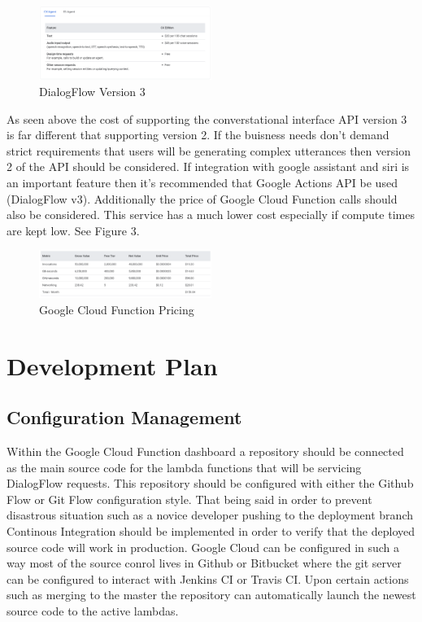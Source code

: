 \documentclass[9pt,software]{livecoms}
\begin{document}
\begin{figure}
  \caption{DialogFlow Version 3}
  \centering
  \includegraphics[width=0.5\textwidth]{CX_Agent.PNG}
\end{figure}

As seen above the cost of supporting the converstational interface API version 3 is far different that supporting version 2. If the buisness needs don't demand strict requirements 
that users will be generating complex utterances then version 2 of the API should be considered. If integration with google assistant and siri is an important feature then it's recommended
that Google Actions API be used (DialogFlow v3). Additionally the price of Google Cloud Function calls should also be considered. This service has a much lower cost especially if compute times
are kept low. See Figure 3.

\begin{figure}
  \caption{Google Cloud Function Pricing}
  \centering
  \includegraphics[width=0.5\textwidth]{GCloudFunction.PNG}
\end{figure}

\section{Development Plan}
\subsection{Configuration Management}
Within the Google Cloud Function dashboard a repository should be connected as the main source code for the lambda functions that will be servicing DialogFlow requests. This repository should be configured
with either the Github Flow or Git Flow configuration style. That being said in order to prevent disastrous situation such as a novice developer pushing to the deployment branch Continous Integration should
be implemented in order to verify that the deployed source code will work in production. Google Cloud can be configured in such a way most of the source conrol lives in Github or Bitbucket where the git server
can be configured to interact with Jenkins CI or Travis CI. Upon certain actions such as merging to the master the repository can automatically launch the newest source code
to the active lambdas.
\end{document}
